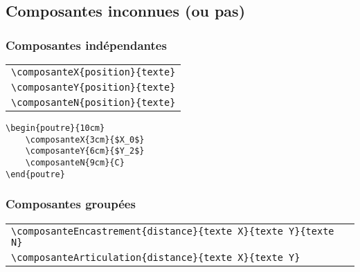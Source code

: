 \documentclass[a4paper,10pt]{article}
\begin{document}
        \begin{poutre}{10cm}
        \end{poutre}
	

    \subsection{Composantes inconnues (ou pas)}
	
	
        \subsubsection{Composantes indépendantes}
	
            \begin{center}
                \begin{tabular}{|c|}
                    \hline
                    \verb!\composanteX{position}{texte}!\\
                    \verb!\composanteY{position}{texte}!\\
                    \verb!\composanteN{position}{texte}!
                    \\\hline
                \end{tabular}
            \end{center}
	
	
           \begin{verbatim}
\begin{poutre}{10cm}
    \composanteX{3cm}{$X_0$}
    \composanteY{6cm}{$Y_2$}
    \composanteN{9cm}{C}
\end{poutre}
        \end{verbatim}
	
\begin{poutre}{10cm}
\end{poutre}
	
        \subsubsection{Composantes groupées}
        
            \begin{center}
                \begin{tabular}{|l|}
                    \hline
                    \verb!\composanteEncastrement{distance}{texte X}{texte Y}{texte N}!\\
                    \verb!\composanteArticulation{distance}{texte X}{texte Y}!
                    \\\hline
                \end{tabular}
            \end{center}
        
\end{document}
